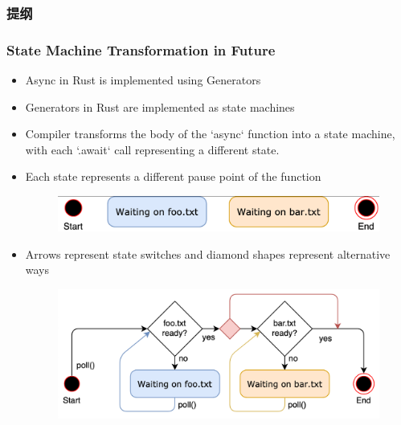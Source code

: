 \begin{frame}
\frametitle{提纲} %
\tableofcontents %

\end{frame}
\begin{frame}[fragile]
    \frametitle{State Machine Transformation in Future}
% 
% 
    \begin{itemize}
        \item Async in Rust is implemented using {\color{red}Generators}
        \item Generators in Rust are implemented as {\color{red}state machines}
        \item {\color{red}Compiler} transforms the body of the `async` function into a state machine, with each `.await` call representing a different state. \pause
        \item {\color{red}Each state} represents a different pause point of the function
% 
    \begin{figure}
    \includegraphics[width=0.4\linewidth]{figs/async-state-machine-states.png}
    \end{figure} \pause
% 
        \item Arrows represent {\color{red}state switches} and diamond shapes represent alternative ways
% 
    \begin{figure}
    \includegraphics[width=0.55\linewidth]{figs/async-state-machine-basic.png}
    \end{figure}
    \end{itemize}
% 
\end{frame}

